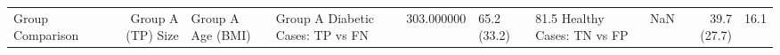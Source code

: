 \begin{tabular}{lrllrllrr}
\toprule
Group Comparison & Group A (TP) Size & Group A Age (BMI) & Group A %
\midrule
Diabetic Cases: TP vs FN & 303.000000 & 65.2 (33.2) & 81.5%
Healthy Cases: TN vs FP & NaN & 39.7 (27.7) & 16.1%
\bottomrule
\end{tabular}
